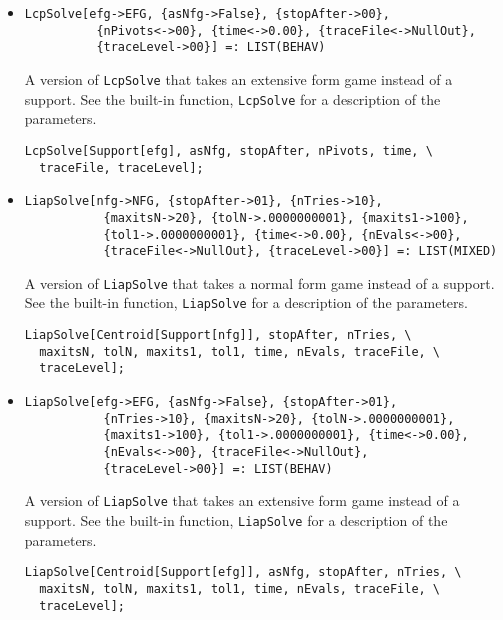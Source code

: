 \begin{itemize}
\item{}
\protect \large \begin{verbatim}
LcpSolve[efg->EFG, {asNfg->False}, {stopAfter->00}, 
          {nPivots<->00}, {time<->0.00}, {traceFile<->NullOut}, 
          {traceLevel->00}] =: LIST(BEHAV)
\end{verbatim}\normalsize

\bd 
A version of \verb+LcpSolve+ that takes an extensive form
game instead of a support.  See the built-in function,
\verb+LcpSolve+ for a description of the parameters.
\begin{verbatim}
LcpSolve[Support[efg], asNfg, stopAfter, nPivots, time, \
  traceFile, traceLevel];
\end{verbatim} 
\ed

\item{}
\protect \large \begin{verbatim}
LiapSolve[nfg->NFG, {stopAfter->01}, {nTries->10}, 
           {maxitsN->20}, {tolN->.0000000001}, {maxits1->100}, 
           {tol1->.0000000001}, {time<->0.00}, {nEvals<->00},
           {traceFile<->NullOut}, {traceLevel->00}] =: LIST(MIXED)
\end{verbatim}\normalsize

\bd 
A version of \verb+LiapSolve+ that takes a normal form
game instead of a support.  See the built-in function,
\verb+LiapSolve+ for a description of the parameters.
\begin{verbatim}
LiapSolve[Centroid[Support[nfg]], stopAfter, nTries, \
  maxitsN, tolN, maxits1, tol1, time, nEvals, traceFile, \
  traceLevel];
\end{verbatim} 
\ed

\item{}
\protect \large \begin{verbatim}
LiapSolve[efg->EFG, {asNfg->False}, {stopAfter->01}, 
           {nTries->10}, {maxitsN->20}, {tolN->.0000000001}, 
           {maxits1->100}, {tol1->.0000000001}, {time<->0.00}, 
           {nEvals<->00}, {traceFile<->NullOut}, 
           {traceLevel->00}] =: LIST(BEHAV)
\end{verbatim}\normalsize

\bd 
A version of \verb+LiapSolve+ that takes an extensive form
game instead of a support.  See the built-in function,
\verb+LiapSolve+ for a description of the parameters.
\begin{verbatim}
LiapSolve[Centroid[Support[efg]], asNfg, stopAfter, nTries, \
  maxitsN, tolN, maxits1, tol1, time, nEvals, traceFile, \
  traceLevel];
\end{verbatim} 
\ed


\end{itemize}
